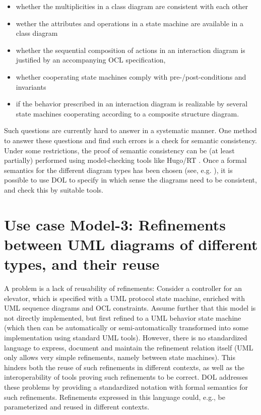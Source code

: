 \documentclass[10pt,fleqn,%
\ifpretendfinal
final%
\else
draft%
\fi,
]{scrreprt}
\begin{document}
\begin{itemize}
\item whether the multiplicities in a class diagram are consistent with each other
\item wether the attributes and operations in a state machine are
available in a class diagram
\item	  whether the sequential composition of actions in an interaction diagram is justified by an accompanying OCL specification,
\item 	whether cooperating state machines comply with pre-/post-conditions and invariants
\item 	if the behavior prescribed in an interaction diagram is realizable by several state machines cooperating according to a composite structure diagram.
\end{itemize}
Such questions are currently hard to answer in a systematic manner. One method to answer these questions and find such errors is a check for semantic 
consistency. Under some restrictions, the proof of semantic consistency can be (at least partially) performed using model-checking tools like Hugo/RT \cite{knapp-wuttke:models06wsh:2007}. 
Once a formal semantics for the different diagram types has been chosen (see, e.g. \cite{knapp-mossakowski-roggenbach:corr:2014}), it is possible to use DOL to specify in which 
sense the diagrams need to be consistent, and check this by suitable tools.

\section{Use case Model-3: Refinements between UML diagrams of different types, and their reuse}
A problem is a lack of reusability of refinements: Consider a controller for an elevator, which is specified with a UML protocol state machine, enriched with UML 
sequence diagrams and OCL constraints. Assume further that this model is not directly implemented, but first refined to a UML behavior state machine (which then 
can be automatically or semi-automatically transformed into some implementation using standard UML tools). However, there is no standardized language to 
express, document and maintain the refinement relation itself (UML only allows very simple refinements, namely between state machines). This hinders both the 
reuse of such refinements in different contexts, as well as the interoperability of tools proving such refinements to be correct. DOL  
addresses these problems by providing a standardized notation with formal semantics for such refinements. Refinements expressed in this language could, e.g., be 
parameterized and reused in different contexts.
\end{document}
